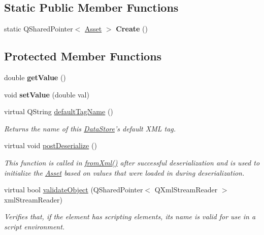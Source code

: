 \subsection*{Static Public Member Functions}
\begin{DoxyCompactItemize}
\item 
\hypertarget{class_picto_1_1_numeric_variable_a56bc58283e5de47dd9f6f41ed4b7f98f}{static Q\-Shared\-Pointer$<$ \hyperlink{class_picto_1_1_asset}{Asset} $>$ {\bfseries Create} ()}\label{class_picto_1_1_numeric_variable_a56bc58283e5de47dd9f6f41ed4b7f98f}

\end{DoxyCompactItemize}
\subsection*{Protected Member Functions}
\begin{DoxyCompactItemize}
\item 
\hypertarget{class_picto_1_1_numeric_variable_a0c0bf0bef2f4d829937c4f1e34174ad7}{double {\bfseries get\-Value} ()}\label{class_picto_1_1_numeric_variable_a0c0bf0bef2f4d829937c4f1e34174ad7}

\item 
\hypertarget{class_picto_1_1_numeric_variable_a065d25de21ac6bd5995aba77cdbd0eb0}{void {\bfseries set\-Value} (double val)}\label{class_picto_1_1_numeric_variable_a065d25de21ac6bd5995aba77cdbd0eb0}

\item 
virtual Q\-String \hyperlink{class_picto_1_1_numeric_variable_af250622e471feb68d9466480b59b602b}{default\-Tag\-Name} ()
\begin{DoxyCompactList}\small\item\em Returns the name of this \hyperlink{class_picto_1_1_data_store}{Data\-Store}'s default X\-M\-L tag. \end{DoxyCompactList}\item 
virtual void \hyperlink{class_picto_1_1_numeric_variable_a58e42e534efa6b84f4e23dead549604d}{post\-Deserialize} ()
\begin{DoxyCompactList}\small\item\em This function is called in \hyperlink{class_picto_1_1_asset_a8bed4da09ecb1c07ce0dab313a9aba67}{from\-Xml()} after successful deserialization and is used to initialize the \hyperlink{class_picto_1_1_asset}{Asset} based on values that were loaded in during deserialization. \end{DoxyCompactList}\item 
\hypertarget{class_picto_1_1_numeric_variable_a9507fbddffd7321c6194b97e6b279c51}{virtual bool \hyperlink{class_picto_1_1_numeric_variable_a9507fbddffd7321c6194b97e6b279c51}{validate\-Object} (Q\-Shared\-Pointer$<$ Q\-Xml\-Stream\-Reader $>$ xml\-Stream\-Reader)}\label{class_picto_1_1_numeric_variable_a9507fbddffd7321c6194b97e6b279c51}

\begin{DoxyCompactList}\small\item\em Verifies that, if the element has scripting elements, its name is valid for use in a script environment. \end{DoxyCompactList}\end{DoxyCompactItemize}
